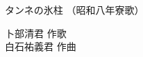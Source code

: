 \documentclass[10pt,b5j]{tarticle} %
\begin{document}
\begin{minipage}[c]{0.7\hsize} %
    \begin{center}
        {\LARGE
            タンネの氷柱 %
        }
        {\small 
            （昭和八年寮歌） %
        }
    \end{center}
\end{minipage}
\begin{minipage}[c]{0.3\hsize} %
    \begin{flushright} %
        卜部清君 作歌\\白石祐義君 作曲 %
    \end{flushright}
\end{minipage}
\end{document}
